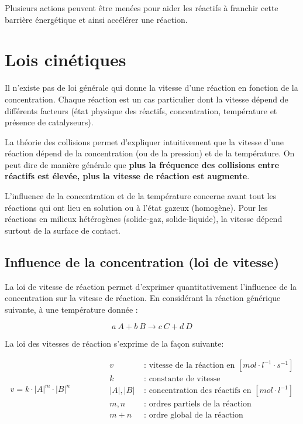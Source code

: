 \documentclass[
  11pt,
  french,
  a4paper,
  openany]{book}
\begin{document}
Plusieurs actions peuvent être menées pour aider les réactifs à franchir cette barrière énergétique et ainsi accélérer une réaction.

\hypertarget{lois-cinuxe9tiques}{%
\section{Lois cinétiques}\label{lois-cinuxe9tiques}}

Il n'existe pas de loi générale qui donne la vitesse d'une réaction en fonction de la concentration. Chaque réaction est un cas particulier dont la vitesse dépend de différents facteurs (état physique des réactifs, concentration, température et présence de catalyseurs).

La théorie des collisions permet d'expliquer intuitivement que la vitesse d'une réaction dépend de la concentration (ou de la pression) et de la température. On peut dire de manière générale que \textbf{plus la fréquence des collisions entre réactifs est élevée, plus la vitesse de réaction est augmente}.

L'influence de la concentration et de la température concerne avant tout les réactions qui ont lieu en solution ou à l'état gazeux (homogène). Pour les réactions en milieux hétérogènes (solide-gaz, solide-liquide), la vitesse dépend surtout de la surface de contact.

\hypertarget{influence-de-la-concentration-loi-de-vitesse}{%
\subsection{Influence de la concentration (loi de vitesse)}\label{influence-de-la-concentration-loi-de-vitesse}}

La loi de vitesse de réaction permet d'exprimer quantitativement l'influence de la concentration sur la vitesse de réaction. En considérant la réaction générique suivante, à une température donnée :

\[
a\ A + b\ B \rightarrow c\ C + d\ D
\]

La loi des vitesses de réaction s'exprime de la façon suivante:

\[
\begin{split}
v = k \cdot |A|^m \cdot |B|^n
\end{split}
\qquad\qquad
\begin{split}
v &\text{ : vitesse de la réaction en } [mol \cdot l^{-1} \cdot s^{-1}] \\
k &\text{ : constante de vitesse} \\
|A|, |B| &\text{ : concentration des réactifs en } [mol \cdot l^{-1}] \\
m, n &\text{ : ordres partiels de la réaction} \\
m+n &\text{ : ordre global de la réaction}
\end{split}
\]
\end{document}
